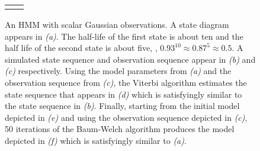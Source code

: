 \begin{figure}[htbp]
{\begin{tabular}[H]{cc}
{        \def\prbb{$0.12$}%
        \def\prbc{$0.08$}%
        \def\prbd{$0.88$}%
        \def\lbla{\parbox[t]{1.8in}{$\mu=-0.74$\\$\sigma^2=1.09$}}%
        \def\lblb{\parbox[t]{1.8in}{$\mu=1.17$\\$\sigma^2=1.27$}}%
        
      }
      \end{tabular}}
  \caption[An HMM with scalar Gaussian observations.]%
  {An HMM with scalar Gaussian observations.  A state diagram appears in
    \emph{(a)}.  The half-life of the first state is about ten and the half
    life of the second state is about five, \ie, $0.93^{10} \approx
    0.87^5 \approx 0.5$.  A simulated state sequence and observation
    sequence appear in \emph{(b)} and \emph{(c)} respectively.  Using the model
    parameters from \emph{(a)} and the observation sequence from \emph{(c)}, the
    Viterbi algorithm estimates the state sequence that appears in \emph{(d)}
    which is satisfyingly similar to the state sequence in \emph{(b)}.
    Finally, starting from the initial model depicted in \emph{(e)} and using
    the observation sequence depicted in \emph{(c)}, 50 iterations of the
    Baum-Welch algorithm produces the model depicted in \emph{(f)} which is
    satisfyingly similar to \emph{(a)}.}
  \label{fig:ScalarGaussian}
\end{figure}

